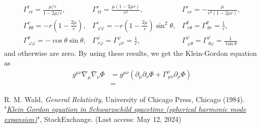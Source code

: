 \documentclass[a4paper,pdftex,10pt]{article}
\begin{document}
\begin{enumerate}
\begin{equation}
\begin{array}{lll}
            \Gamma^{t}_{\ rt}
            =
            \frac{\mu/r}{1-2\mu/r}
            ,
             &
            \Gamma^{r}_{\ tt}
            =
            \frac{\mu(1-2\mu r)}{r^2}
            ,
             &
            \Gamma^{r}_{\ rr}
            =
            -\frac{\mu}{r^2(1-2\mu r)}
            ,
            \\
            \Gamma^{r}_{\ \theta\theta}
            =
            -r\left( 1-\frac{2\mu}{r} \right)
            ,
             &
            \Gamma^{r}_{\ \varphi\varphi}
            =
            -r\left( 1-\frac{2\mu}{r} \right)\sin^2\theta
            ,
             &
            \Gamma^{\theta}_{\ r\theta}
            =
            \Gamma^{\theta}_{\ \theta r}
            =
            \frac{1}{r}
            ,
            \\
            \Gamma^{\theta}_{\ \varphi\varphi}
            =
            -\cos\theta\sin\theta
            ,
             &
            \Gamma^{\varphi}_{\ r\varphi}
            =
            \Gamma^{\varphi}_{\ \varphi r}
            =
            \frac{1}{r}
            ,
             &
            \Gamma^{\varphi}_{\ \varphi\theta}
            =
            \Gamma^{\varphi}_{\ \theta\varphi}
            =
            \frac{1}{\tan\theta}
          \end{array}
        \end{equation}
        and otherwise are zero. By using these results, we get the Klein-Gordon equation as
        \begin{align}
          g^{\mu\nu}\nabla_{\mu}\nabla_{\nu}
          \Phi
          &=
          g^{\mu\nu}
          (\partial_{\mu}\partial_{\nu}\Phi+\Gamma^{\rho}_{\ \mu\nu}\partial_{\rho}\Phi)
          \nonumber
          \\
          &=
        \end{align}
        











\end{enumerate}

\clearpage
\begin{thebibliography}{99}
  R. M. Wald, \textit{General Relativity}, University of Chicago Press, Chicago (1984).
  "\href{https://physics.stackexchange.com/questions/313336/klein-gordon-equation-in-schwarzschild-spacetime-spherical-harmonic-mode-expans}{\textit{Klein Gordon equation in Schwarzschild spacetime (spherical harmonic mode expansion)}}", StackExchange. (Last access: May 12, 2024)
\end{thebibliography}


% 
% 

\end{document}
